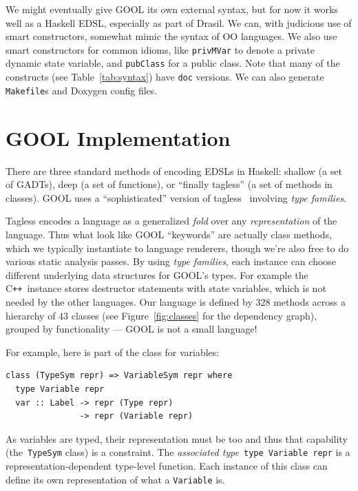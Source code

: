 \documentclass[sigplan,screen,10pt]{acmart}
\newcommand{\Cplusplus}{C\texttt{++}}
\begin{document}
We might eventually give GOOL its own external syntax, but for now it works
well as a Haskell EDSL, especially as part of Drasil. We can, with judicious
use of smart constructors, somewhat mimic the syntax of OO languages.
We also use smart constructors for common idioms, like
\verb|privMVar| to denote a private dynamic state variable, 
and \verb|pubClass| for a public class.  Note that many of the constructs
(see Table~\ref{tab:syntax}) have \verb|doc| versions.  We can also
generate \verb|Makefile|s and Doxygen config files.

\section{GOOL Implementation} \label{sec:implementation}

There are three standard methods of encoding EDSLs in Haskell:
shallow (a set of GADTs), deep (a set of functions), or ``finally
tagless'' (a set of methods in classes).  GOOL uses a
``sophisticated'' version of tagless~\cite{carette2009finally}
involving \emph{type families}. 

Tagless encodes a language as a generalized
\emph{fold} over any \emph{representation} of the language.  Thus what
look like GOOL ``keywords'' are actually class methods, which we typically 
instantiate to language renderers, though we're also free to do various static 
analysis passes. By using \emph{type families}, each instance can choose
different underlying data structures for GOOL's types.  For example the
\Cplusplus~instance stores destructor statements with state variables, which
is not needed by the other languages.  Our language is defined by 
$328$ methods across a hierarchy of $43$ classes (see Figure~\ref{fig:classes}
for the dependency graph), grouped by functionality 
--- GOOL is not a small language!

For example, here is part of the class for variables:
\begin{lstlisting}
class (TypeSym repr) => VariableSym repr where
  type Variable repr
  var :: Label -> repr (Type repr)
               -> repr (Variable repr)
\end{lstlisting}
As variables are typed, their representation must be too and
thus that capability (the~\verb|TypeSym| class) is a constraint.  
The \emph{associated type}~\verb|type Variable repr| is a representation-dependent
type-level function.  Each instance of this
class can define its own representation of what a
\verb|Variable| is. 
\end{document}
